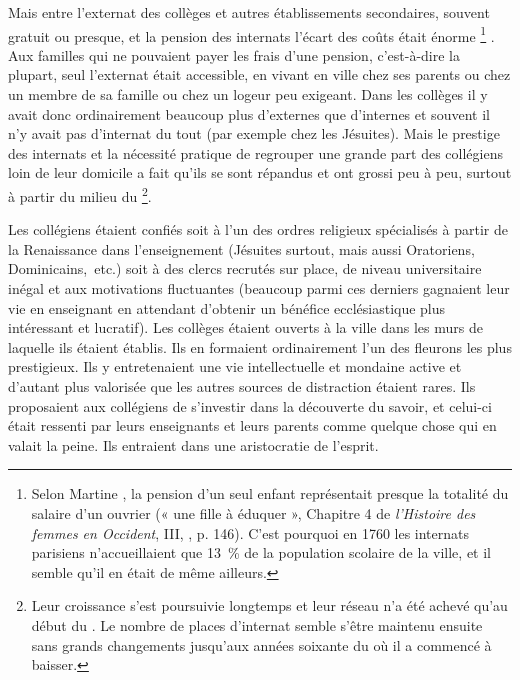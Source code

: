 Mais entre l'externat des collèges et autres établissements secondaires, souvent gratuit ou presque, et la pension des internats l'écart des coûts était énorme%
\footnote{Selon Martine , la pension d'un seul enfant représentait presque la totalité du salaire d'un ouvrier (« une fille à éduquer », Chapitre 4 de \emph{l'Histoire des femmes en Occident}, III, , p. 146). C'est pourquoi en 1760 les internats parisiens n'accueillaient que 13~\% de la population scolaire de la ville, et il semble qu'il en était de même ailleurs.}%
. Aux familles qui ne pouvaient payer les frais d'une pension, c'est-à-dire la plupart, seul l'externat était accessible, en vivant en ville chez ses parents ou chez un membre de sa famille ou chez un logeur peu exigeant. Dans les collèges il y avait donc ordinairement beaucoup plus d'externes que d'internes et souvent il n'y avait pas d'internat du tout (par exemple chez les Jésuites). Mais le prestige des internats et la nécessité pratique de regrouper une grande part des collégiens loin de leur domicile a fait qu'ils se sont répandus et ont grossi peu à peu, surtout à partir du milieu du \footnote{Leur croissance s'est poursuivie longtemps et leur réseau n'a été achevé qu'au début du . Le nombre de places d'internat semble s'être maintenu ensuite sans grands changements jusqu'aux années soixante du  où il a commencé à baisser.}. 

 
 

Les collégiens étaient confiés soit à l'un des ordres religieux spécialisés à partir de la Renaissance dans l'enseignement (Jésuites surtout, mais aussi Oratoriens, Dominicains,~etc.) soit à des clercs recrutés sur place, de niveau universitaire inégal et aux motivations fluctuantes (beaucoup parmi ces derniers gagnaient leur vie en enseignant en attendant d'obtenir un bénéfice ecclésiastique plus intéressant et lucratif). Les collèges étaient ouverts à la ville dans les murs de laquelle ils étaient établis. Ils en formaient ordinairement l'un des fleurons les plus prestigieux. Ils y entretenaient une vie intellectuelle et mondaine active et d'autant plus valorisée que les autres sources de distraction étaient rares. Ils proposaient aux collégiens de s'investir dans la découverte du savoir, et celui-ci était ressenti par leurs enseignants et leurs parents comme quelque chose qui en valait la peine. Ils entraient dans une aristocratie de l'esprit. 

